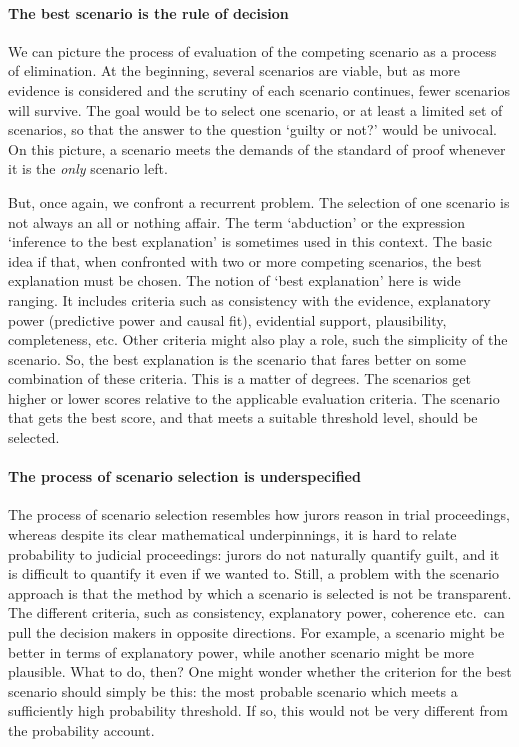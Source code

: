 \documentclass[10pt]{article}
\begin{document}
\paragraph{The best scenario is the rule of decision}

We can picture the process of evaluation of the competing scenario as a process of elimination. 
At the beginning, several scenarios are viable, but as more evidence is considered and the scrutiny of each scenario continues,
fewer scenarios will survive. The goal would be to select one scenario, or at least a limited set of scenarios, so that 
the answer to the question `guilty or not?' would be univocal. On this picture, a scenario meets the demands of the standard 
of proof whenever it is the \textit{only} scenario left.

But, once again, we confront a recurrent problem. The selection of one scenario is not always an all or nothing affair.
The term `abduction' or the expression `inference to the best explanation' is sometimes used in this context. The basic idea if that, when confronted 
with two or more competing scenarios, the best explanation must be chosen. The notion of `best explanation' here is wide ranging. It includes criteria such as 
consistency with the evidence, explanatory power (predictive power and causal fit), evidential support, plausibility, completeness, etc. 
Other criteria might also play a role, such the simplicity of the scenario.  So, the best explanation is the scenario that fares 
better on some combination of these criteria. This is a matter of degrees. The scenarios get higher 
or lower scores relative to the applicable evaluation criteria. The scenario that gets the best score, and that 
meets a suitable threshold level, should be selected. 





\paragraph{The process of scenario selection is underspecified}

The process of scenario selection resembles how jurors reason in trial proceedings, whereas despite its 
clear mathematical underpinnings, it is hard to relate probability to judicial proceedings: jurors do not 
naturally quantify guilt, and it is difficult to quantify it even if we wanted to. Still, a problem with the scenario approach is that 
the method by which a scenario is selected is not be transparent. The different criteria, such as consistency, explanatory power, coherence etc.\ 
can pull the decision makers in opposite directions. For example, a scenario might be better in terms of explanatory power, while another scenario might 
be more plausible. What to do, then? One might wonder whether the criterion for the best scenario should simply be this:
the most probable scenario which meets a sufficiently high probability threshold. If so, this would not be very 
different from the probability account. 
\end{document}
